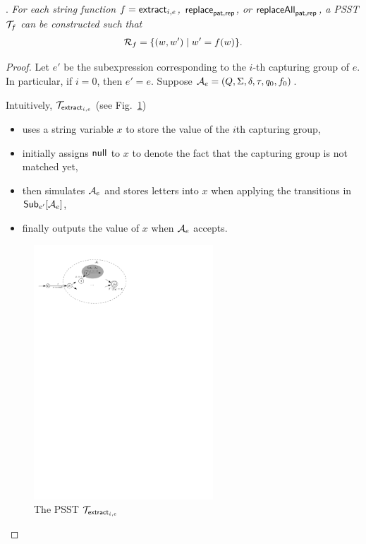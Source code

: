
\medskip

. 
\emph{For each string function $f = \mathsf{extract}_{i,e}$, $\mathsf{replace}_{\mathsf{pat}, \mathsf{rep}}$, or $\mathsf{replaceAll}_{\mathsf{pat}, \mathsf{rep}}$, a PSST $\mathcal{T}_f$ can be constructed such that 
$$\mathcal{R}_{f} = \{(w, w') \mid w'= f(w)\}.$$}

\begin{proof}
	Let $e'$ be the subexpression corresponding to the $i$-th capturing group of $e$. In particular, if $i=0$, then $e' = e$. 
	Suppose $\mathcal{A}_e = (Q, \Sigma, \delta, \tau, q_0, f_0)$. 
	
	Intuitively, $\mathcal{T}_{\mathsf{extract}_{i,e}}$ (see Fig.~\ref{fig-psst-extract})
	\begin{itemize}
	\item uses a string variable $x$ to store the value of the $i$th capturing group,
	\item initially assigns $\mathsf{null}$ to $x$ to denote the fact that the capturing group is not matched yet,
	\item then simulates $\mathcal{A}_e$ and stores letters into $x$ when applying the transitions in ${\sf Sub}_{e'}[\mathcal{A}_e]$,
	\item finally outputs the value of $x$ when $\mathcal{A}_e$ accepts.
	\end{itemize}

	\begin{figure}[ht]
		\centering
		\includegraphics[width = 0.6\textwidth]{psst-extract.pdf}
		\caption{The PSST $\mathcal{T}_{\mathsf{extract}_{i,e}}$}
		\label{fig-psst-extract}
	\end{figure}
	

\end{proof}
